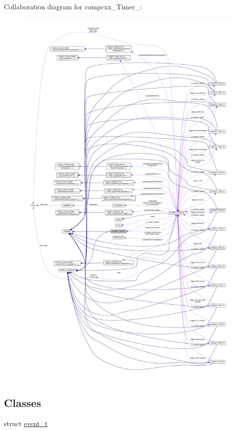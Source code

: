 Collaboration diagram for compcxx\+\_\+\+Timer\+\_\+:\nopagebreak
\begin{figure}[H]
\begin{center}
\leavevmode
\includegraphics[height=550pt]{classcompcxx__Timer__4__coll__graph}
\end{center}
\end{figure}
\subsection*{Classes}
\begin{DoxyCompactItemize}
\item 
struct \hyperlink{structcompcxx__Timer__4_1_1event__t}{event\+\_\+t}
\end{DoxyCompactItemize}
